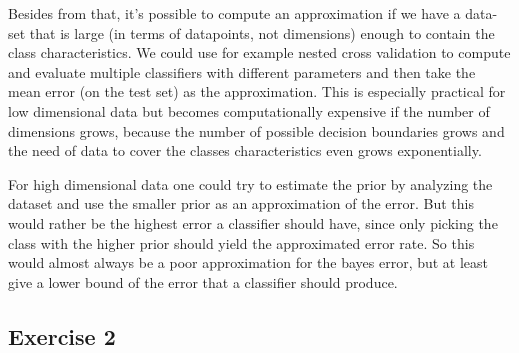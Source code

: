 \documentclass[10pt,a4paper]{article}
\begin{document}
Besides from that, it's possible to compute an approximation if we have a data-set that is large (in terms of datapoints, not dimensions) enough to contain the class characteristics. We could use for example nested cross validation to compute and evaluate multiple classifiers with different parameters and then take the mean error (on the test set) as the approximation. This is especially practical for low dimensional data but becomes computationally expensive if the number of dimensions grows, because the number of possible decision boundaries grows and the need of data to cover the classes characteristics even grows exponentially.

For high dimensional data one could try to estimate the prior by analyzing the dataset and use the smaller prior as an approximation of the error. But this would rather be the highest error a classifier should have, since only picking the class with the higher prior should yield the approximated error rate. So this would almost always be a poor approximation for the bayes error, but at least give a lower bound of the error that a classifier should produce.

\subsection*{Exercise 2}
\end{document}
